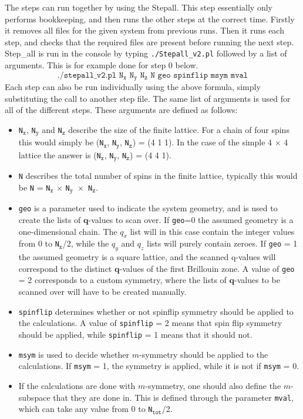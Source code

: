 \documentclass{article}
\begin{document}
	The steps can run together by using the Stepall. This step essentially only performs bookkeeping, and then runs the other steps at the correct time. Firstly it removes all files for the given system from previous runs. Then it runs each step, and checks that the required files are present before running the next step. Step\_all is run in the console by typing \texttt{./Stepall\_v2.pl} followed by a list of arguments. This is for example done for step 0 below.
	\begin{equation*}
		\texttt{./stepall\_v2.pl N$_\texttt{x}$ N$_\texttt{y}$ N$_\texttt{z}$ N geo spinflip msym mval}
	\end{equation*}
	Each step can also be run individually using the above formula, simply substituting the call to another step file. The same list of arguments is used for all of the different steps. These arguments are defined as follows:
	\begin{itemize}
		\item \texttt{N$_\texttt{x}$}, \texttt{N$_\texttt{y}$} and \texttt{N$_\texttt{z}$} describe the size of the finite lattice. For a chain of four spins this would simply be (\texttt{N$_\texttt{x}$}, \texttt{N$_\texttt{y}$}, \texttt{N$_\texttt{z}$}) = (4 1 1). In the case of the simple 4 $\times$ 4 lattice the answer is (\texttt{N$_\texttt{x}$}, \texttt{N$_\texttt{y}$}, \texttt{N$_\texttt{z}$}) = (4 4 1).
		\item \texttt{N} describes the total number of spins in the finite lattice, typically this would be \texttt{N}  = \texttt{N$_\texttt{x}$}  $\times$ \texttt{N$_\texttt{y} $  $\times$ \texttt{N$_\texttt{z} $}}.
		\item \texttt{geo} is a parameter used to indicate the system geometry, and is used to create the lists of $\textbf{q}$-values to scan over. If \texttt{geo}=0 the assumed geometry is a one-dimensional chain. The $q_x$ list will in this case contain the integer values from 0 to \texttt{N$_\texttt{x}$}/2, while the $q_y$ and $q_z$ lists will purely contain zeroes. If \texttt{geo} = 1 the assumed geometry is a square lattice, and the scanned q-values will correspond to the distinct $\textbf{q}$-values of the first Brillouin zone. A value of \texttt{geo} = 2 corresponds to a custom symmetry, where the lists of $\textbf{q}$-values to be scanned over will have to be created manually. 
		\item \texttt{spinflip} determines whether or not spinflip symmetry should be applied to the calculations. A value of \texttt{spinflip} = 2 means that spin flip symmetry should be applied, while \texttt{spinflip} = 1 means that it should not. 
		\item  \texttt{msym} is used to decide whether $m$-symmetry should be applied to the calculations. If \texttt{msym} = 1, the symmetry is applied, while it is not if \texttt{msym} = 0.
		\item If the calculations are done with $m$-symmetry, one should also define the $m$-subspace that they are done in. This  is defined through the parameter \texttt{mval}, which can take any value from 0 to \texttt{N$_\texttt{tot}$}/2. 
	\end{itemize}
\end{document}
